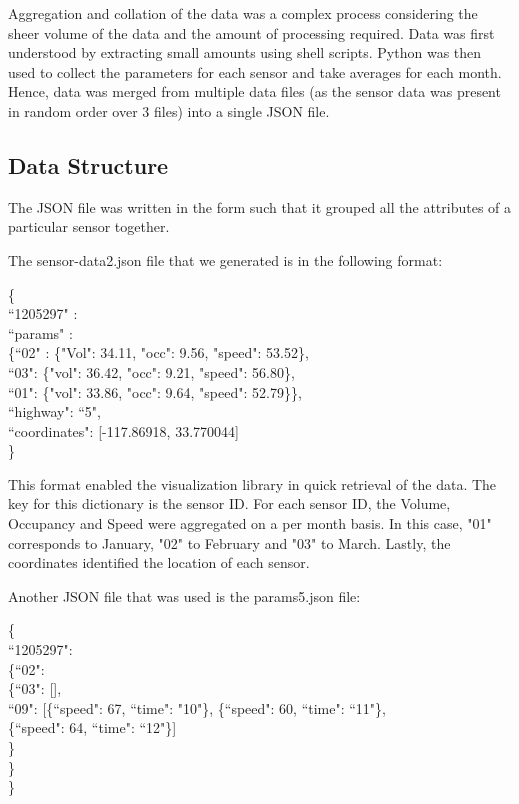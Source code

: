 \documentclass{llncs}
\begin{document}
Aggregation and collation of the data was a complex process considering the sheer volume of the data and the amount of processing required. Data was first understood by extracting small amounts using shell scripts. Python was then used to collect the parameters for each sensor and take averages for each month. Hence, data was merged from multiple data files (as the sensor data was present in random order over 3 files)  into a single JSON file.

\subsection {Data Structure}\label{sec:Data Structure}
The JSON file was written in the form such that it grouped all the attributes of a particular sensor together. 

The sensor-data2.json file that we generated is in the following format:

\{
\\ \indent ``1205297" :
\\ \indent ``params"  :
\\ \indent \indent  \{``02" :  \{"Vol": 34.11, "occ": 9.56, "speed": 53.52\},
\\ \indent \indent  ``03": \{"vol": 36.42, "occ": 9.21, "speed": 56.80\}, 
\\ \indent \indent   ``01": \{"vol": 33.86, "occ": 9.64, "speed": 52.79\}\}, 
\\ \indent    ``highway": ``5", 
\\ \indent ``coordinates": [-117.86918, 33.770044]
\\ \indent \}

This format enabled the visualization library in quick retrieval of the data. The key for this dictionary is the sensor ID. For each sensor ID, the Volume, Occupancy and Speed were aggregated on a per month basis. In this case, "01" corresponds to January, "02" to February and "03" to March. Lastly, the coordinates identified the location of each sensor.

Another JSON file that was used is the params5.json file:

\{
\\ \indent ``1205297": 
\\ \indent \{``02": 
\\ \indent \indent \{``03": [],
\\ \indent \indent  ``09": [\{``speed": 67, ``time": "10"\}, \{``speed": 60, ``time": ``11"\}, 
\\ \indent \indent  \indent \{``speed": 64, ``time": ``12"\}]
\\ \indent \indent \}
\\ \indent \}
\\ \}
\end{document}

